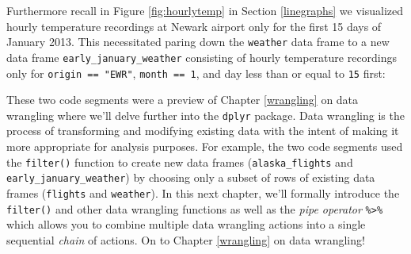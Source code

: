\documentclass[12pt, krantz2,]{krantz}
\makeatletter
\newenvironment{Shaded}{\begin{snugshade}}{\end{snugshade}}
\newcommand{\DataTypeTok}[1]{\textcolor[rgb]{0.27,0.27,0.27}{#1}}
\newcommand{\DecValTok}[1]{\textcolor[rgb]{0.06,0.06,0.06}{#1}}
\newcommand{\KeywordTok}[1]{\textcolor[rgb]{0.27,0.27,0.27}{\textbf{#1}}}
\newcommand{\NormalTok}[1]{#1}
\newcommand{\OperatorTok}[1]{\textcolor[rgb]{0.43,0.43,0.43}{\textbf{#1}}}
\newcommand{\StringTok}[1]{\textcolor[rgb]{0.5,0.5,0.5}{#1}}
\newenvironment{kframe}{%
\medskip{}
\setlength{\fboxsep}{.8em}
 \def\at@end@of@kframe{}%
 \ifinner\ifhmode%
  \def\at@end@of@kframe{\end{minipage}}%
  \begin{minipage}{\columnwidth}%
 \fi\fi%
 \def\FrameCommand##1{\hskip\@totalleftmargin \hskip-\fboxsep
 \colorbox{shadecolor}{##1}\hskip-\fboxsep
     \hskip-\linewidth \hskip-\@totalleftmargin \hskip\columnwidth}%
 \MakeFramed {\advance\hsize-\width
   \@totalleftmargin\z@ \linewidth\hsize
   \@setminipage}}%
 {\par\unskip\endMakeFramed%
 \at@end@of@kframe}
\renewenvironment{Shaded}{\begin{kframe}}{\end{kframe}}
\makeatother
\begin{document}
\begin{Shaded}
\end{Shaded}

Furthermore recall in Figure \ref{fig:hourlytemp} in Section \ref{linegraphs} we visualized hourly temperature recordings at Newark airport only for the first 15 days of January 2013. This necessitated paring down the \texttt{weather} data frame to a new data frame \texttt{early\_january\_weather} consisting of hourly temperature recordings only for \texttt{origin\ ==\ "EWR"}, \texttt{month\ ==\ 1}, and day less than or equal to \texttt{15} first:

\begin{Shaded}
\end{Shaded}

These two code segments were a preview of Chapter \ref{wrangling} on data wrangling where we'll delve further into the \texttt{dplyr} package. Data wrangling is the process of transforming and modifying existing data with the intent of making it more appropriate for analysis purposes. For example, the two code segments used the \texttt{filter()} function to create new data frames (\texttt{alaska\_flights} and \texttt{early\_january\_weather}) by choosing only a subset of rows of existing data frames (\texttt{flights} and \texttt{weather}). In this next chapter, we'll formally introduce the \texttt{filter()} and other data wrangling functions as well as the \emph{pipe operator} \texttt{\%\textgreater{}\%} which allows you to combine multiple data wrangling actions into a single sequential \emph{chain} of actions. On to Chapter \ref{wrangling} on data wrangling!
\end{document}

